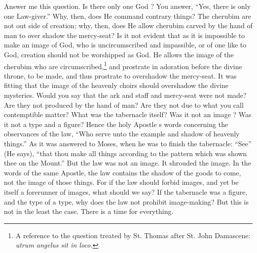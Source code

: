 \documentclass[10pt]{book}
\newcommand{\switchgreek}[1][]{\selectlanguage{polutonikogreek} \switchcolumn*[#1]}
\begin{document}
\begin{paracol}{2}
Answer me this question. Is there only one 
God ? You answer, ``Yes, there is only one 
Law-giver.'' Why, then, does He command 
contrary things? The cherubim are not out 
side of creation; why, then, does He allow 
cherubim carved by the hand of man to over 
shadow the mercy-seat? Is it not evident that 
as it is impossible to make an image of God, 
who is uncircumscribed and impassible, or of 
one like to God, creation should not be 
worshipped as God. He allows the image of 
the cherubim who are circumscribed,\footnote{A reference to the question treated by St. Thomas after St. John Damascene: \emph{utrum angelus sit in loco.}} and 
prostrate in adoration before the divine throne, 
to be made, and thus prostrate to overshadow 
the mercy-seat. It was fitting that the image 
of the heavenly choirs should overshadow the 
divine mysteries. Would you say that the ark 
and staff and mercy-seat were not made? Are 
they not produced by the hand of man? Are 
they not due to what you call contemptible 
matter? What was the tabernacle itself? 
Was it not an image ? Was it not a type 
and a figure? Hence the holy Apostle s words 
concerning the observances of the law, ``Who 
serve unto the example and shadow of heavenly 
things.'' As it was answered to Moses, when 
he was to finish the tabernacle: ``See'' (He 
says), ``that thou make all things according to 
the pattern which was shown thee on the 
Mount.'' But the law was not an image. It 
shrouded the image. In the words of the same 
Apostle, the law contains the shadow of the 
goods to come, not the image of those things. 
For if the law should forbid images, and yet be 
itself a forerunner of images, what should we 
say? If the tabernacle was a figure, and the 
type of a type, why does the law not prohibit 
image-making? But this is not in the least 
the case. There is a time for everything. 

\switchgreek


\end{paracol}
\end{document}
